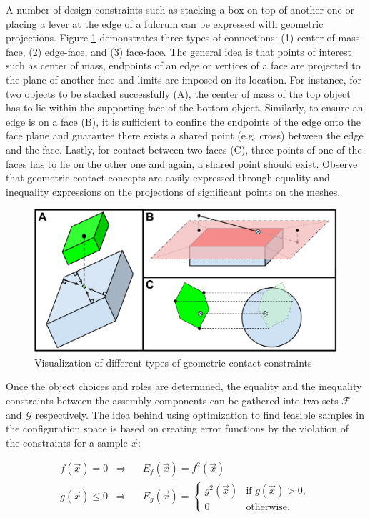 \documentclass[runningheads,a4paper]{llncs}
\begin{document}
A number of design constraints such as stacking a box on top of another one or placing a lever
at the edge of a fulcrum can be expressed with geometric projections. Figure \ref{fig:constraints}
demonstrates three types of connections: (1) center of mass-face, (2) edge-face, and (3) face-face. 
The general idea is that points of interest such as center of mass, endpoints of an edge or vertices
of a face are projected to the plane of another face and limits are imposed on its location. For instance,
for two objects to be stacked successfully (A), the center of mass of the top object has to lie within
the supporting face of the bottom object. Similarly, to ensure an edge is on a face (B), it is sufficient
to confine the endpoints of the edge onto the face plane and guarantee there exists a shared point
(e.g. cross) between the edge and the face. Lastly, for contact between two faces (C), 
three points of one of the faces has to lie on the other one and again, a shared point should exist.
Observe that geometric contact concepts are easily expressed through equality
and inequality expressions on the projections of significant points on the meshes. 

\begin{figure}[ht!] 
  \centering
  \includegraphics[width=0.75\linewidth]{Figures/constraints.png}
  \caption{Visualization of different types of geometric contact constraints}
  \label{fig:constraints}
\end{figure}

Once the object choices and roles are determined, the equality and the inequality constraints between
the assembly components can be gathered into two sets $\mathcal{F}$ and $\mathcal{G}$ respectively.
The idea behind using optimization to find feasible samples in the configuration space is based on
creating error functions by the violation of the constraints for a sample $\vec{x}$:

\vspace{-1em}
\begin{align*}
f(\vec{x}) = 0 \;\; \Rightarrow & \;\; E_f(\vec{x}) = f^2(\vec{x}) \\
g(\vec{x}) \leq 0 \;\; \Rightarrow & \;\; E_g(\vec{x}) = 
	\begin{cases}
		g^2(\vec{x}) & \text{if $g(\vec{x}) > 0 $}, \\
	0        & \text{otherwise}.
	\end{cases}
\end{align*}
\end{document}
